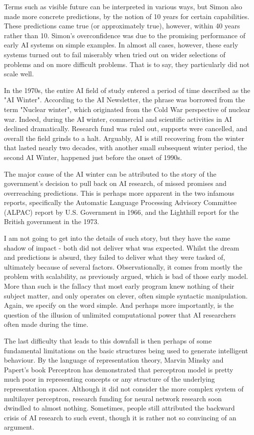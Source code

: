 Terms such as visible future can be interpreted in various ways, but Simon also made more concrete predictions, by the notion of 10 years for certain capabilities. These predictions came true (or approximately true), however, within 40 years rather than 10. Simon's overconfidence was due to the promising performance of early AI systems on simple examples. In almost all cases, however, these early systems turned out to fail miserably when tried out on wider selections of problems and on more difficult problems. That is to say, they particularly did not scale well. 

In the 1970s, the entire AI field of study entered a period of time described as the "AI Winter". According to the AI Newsletter, the phrase was borrowed from the term "Nuclear winter", which originated from the Cold War perspective of nuclear war. Indeed, during the AI winter, commercial and scientific activities in AI declined dramatically. Research fund was ruled out, supports were cancelled, and overall the field grinds to a halt. Arguably, AI is still recovering from the winter that lasted nearly two decades, with another small subsequent winter period, the second AI Winter, happened just before the onset of 1990s. 

The major cause of the AI winter can be attributed to the story of the government's decision to pull back on AI research, of missed promises and overreaching predictions. This is perhaps more apparent in the two infamous reports, specifically the Automatic Language Processing Advisory Committee (ALPAC) report by U.S. Government in 1966, and the Lighthill report for the British government in the 1973. 

I am not going to get into the details of such story, but they have the same shadow of impact - both did not deliver what was expected. Whilst the dream and predictions is absurd, they failed to deliver what they were tasked of, ultimately because of several factors. Observationally, it comes from mostly the problem with scalability, as previously argued, which is bad of those early model. More than such is the fallacy that most early program knew nothing of their subject matter, and only operates on clever, often simple syntactic manipulation. Again, we specify on the word simple. And perhaps more importantly, is the question of the illusion of unlimited computational power that AI researchers often made during the time. 

The last difficulty that leads to this downfall is then perhaps of some fundamental limitations on the basic structures being used to generate intelligent behaviour. By the language of representation theory, Marvin Minsky and Papert's book Perceptron has demonstrated that perceptron model is pretty much poor in representing concepts or any structure of the underlying representation spaces. Although it did not consider the more complex system of multilayer perceptron, research funding for neural network research soon dwindled to almost nothing. Sometimes, people still attributed the backward crisis of AI research to such event, though it is rather not so convincing of an argument. 

